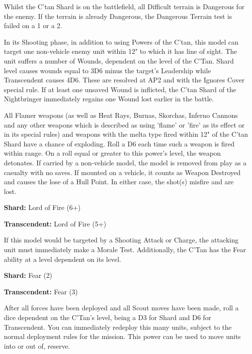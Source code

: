  \label{Withering Worldscape}

Whilst the C'tan Shard is on the battlefield, all Difficult terrain is Dangerous for the enemy. If the terrain is already Dangerous, the Dangerous Terrain test is failed on a 1 or a 2.


 \label{Gaze of Death}

In its Shooting phase, in addition to using Powers of the C’tan, this model can target one non-vehicle enemy unit within 12" to which it has line of sight. The unit suffers a number of Wounds, dependent on the level of the C'Tan. Shard level causes wounds equal to 3D6 minus the target's Leadership while Transcendent causes 4D6. These are resolved at AP2 and with the Ignores Cover special rule. If at least one unsaved Wound is inflicted, the C’tan Shard of the Nightbringer immediately regains one Wound lost earlier in the battle.

 \label{Lord of Fire}

All Flamer weapons (as well as Heat Rays, Burnas, Skorchas, Inferno Cannons and any other weapons which is described as using 'flame' or 'fire' as its effect or in its special rules) and weapons with the melta type fired within 12" of the C'tan Shard have a chance of exploding. Roll a D6 each time such a weapon is fired within range. On a roll equal or greater to this power's level, the weapon detonates. If carried by a non-vehicle model, the model is removed from play as a casualty with no saves. If mounted on a vehicle, it counts as Weapon Destroyed and causes the lose of a Hull Point. In either case, the shot(s) misfire and are lost.

\textbf{Shard:} Lord of Fire (6+)

\textbf{Transcendent:} Lord of Fire (5+)


 \label{Gaze of the Abyss}

If this model would be targeted by a Shooting Attack or Charge, the attacking unit must immediately make a Morale Test. Additionally, the C'Tan has the Fear ability at a level dependent on its level.

\textbf{Shard:} Fear (2)

\textbf{Transcendent:} Fear (3)


 \label{Grand Illusion}

After all forces have been deployed and all Scout moves have been made, roll a dice dependent on the C'Tan's level, being a D3 for Shard and D6 for Transcendent. You can immediately redeploy this many units, subject to the normal deployment rules for the mission. This power can be used to move units into or out of, reserve.


